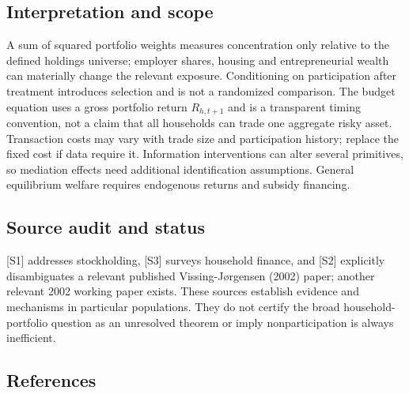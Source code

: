\documentclass[11pt,a4paper]{article}
\begin{document}
\subsection*{Interpretation and scope}
A sum of squared portfolio weights measures concentration only relative to the defined holdings universe; employer shares, housing and entrepreneurial wealth can materially change the relevant exposure. Conditioning on participation after treatment introduces selection and is not a randomized comparison. The budget equation uses a gross portfolio return $R_{h,t+1}$ and is a transparent timing convention, not a claim that all households can trade one aggregate risky asset. Transaction costs may vary with trade size and participation history; replace the fixed cost if data require it. Information interventions can alter several primitives, so mediation effects need additional identification assumptions. General equilibrium welfare requires endogenous returns and subsidy financing.

\subsection*{Source audit and status}
[S1] addresses stockholding, [S3] surveys household finance, and [S2] explicitly disambiguates a relevant published Vissing-Jørgensen (2002) paper; another relevant 2002 working paper exists. These sources establish evidence and mechanisms in particular populations. They do not certify the broad household-portfolio question as an unresolved theorem or imply nonparticipation is always inefficient.

\subsection*{References}
\end{document}
